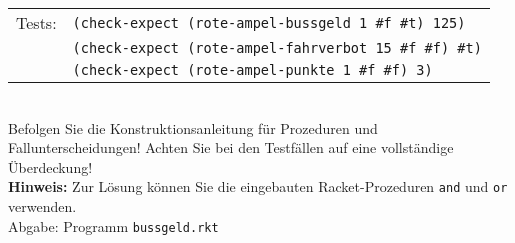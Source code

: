   \begin{tabular}{ll}
    Tests: & \texttt{(check-expect (rote-ampel-bussgeld 1 \#f \#t) 125)} \\
    & \texttt{(check-expect (rote-ampel-fahrverbot 15 \#f \#f) \#t)} \\
    & \texttt{(check-expect (rote-ampel-punkte 1 \#f \#f) 3)} 
  \end{tabular}\\
  
  Befolgen Sie die Konstruktionsanleitung für Prozeduren und
  Fallunterscheidungen! Achten Sie bei den Testfällen auf eine
  vollst\"andige \"Uberdeckung!\\


  \textbf{Hinweis:} Zur Lösung können Sie die eingebauten Racket-Prozeduren
    \texttt{and} und \texttt{or} verwenden.\\


Abgabe: 
    Programm \texttt{bussgeld.rkt}


  \begin{solution}
     
  \end{solution}    

